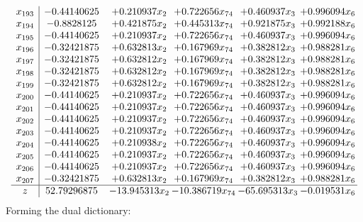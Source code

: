 \documentclass[11pt]{article}
\begin{document}
\[\begin{array}{c| c c@{\hskip 2pt} c@{\hskip 2pt} c@{\hskip 2pt} c@{\hskip 2pt} }
 x_{193}   &  -0.44140625 & + 0.210937 x_{2} & + 0.722656 x_{74} & + 0.460937 x_{3} & + 0.996094 x_{6}\\
 x_{194}   &  -0.8828125 & + 0.421875 x_{2} & + 0.445313 x_{74} & + 0.921875 x_{3} & + 0.992188 x_{6}\\
 x_{195}   &  -0.44140625 & + 0.210937 x_{2} & + 0.722656 x_{74} & + 0.460937 x_{3} & + 0.996094 x_{6}\\
 x_{196}   &  -0.32421875 & + 0.632813 x_{2} & + 0.167969 x_{74} & + 0.382812 x_{3} & + 0.988281 x_{6}\\
 x_{197}   &  -0.32421875 & + 0.632812 x_{2} & + 0.167969 x_{74} & + 0.382812 x_{3} & + 0.988281 x_{6}\\
 x_{198}   &  -0.32421875 & + 0.632812 x_{2} & + 0.167969 x_{74} & + 0.382812 x_{3} & + 0.988281 x_{6}\\
 x_{199}   &  -0.32421875 & + 0.632812 x_{2} & + 0.167969 x_{74} & + 0.382812 x_{3} & + 0.988281 x_{6}\\
 x_{200}   &  -0.44140625 & + 0.210937 x_{2} & + 0.722656 x_{74} & + 0.460937 x_{3} & + 0.996094 x_{6}\\
 x_{201}   &  -0.44140625 & + 0.210937 x_{2} & + 0.722656 x_{74} & + 0.460937 x_{3} & + 0.996094 x_{6}\\
 x_{202}   &  -0.44140625 & + 0.210937 x_{2} & + 0.722656 x_{74} & + 0.460937 x_{3} & + 0.996094 x_{6}\\
 x_{203}   &  -0.44140625 & + 0.210937 x_{2} & + 0.722656 x_{74} & + 0.460937 x_{3} & + 0.996094 x_{6}\\
 x_{204}   &  -0.44140625 & + 0.210938 x_{2} & + 0.722656 x_{74} & + 0.460937 x_{3} & + 0.996094 x_{6}\\
 x_{205}   &  -0.44140625 & + 0.210937 x_{2} & + 0.722656 x_{74} & + 0.460937 x_{3} & + 0.996094 x_{6}\\
 x_{206}   &  -0.44140625 & + 0.210937 x_{2} & + 0.722656 x_{74} & + 0.460937 x_{3} & + 0.996094 x_{6}\\
 x_{207}   &  -0.32421875 & + 0.632813 x_{2} & + 0.167969 x_{74} & + 0.382812 x_{3} & + 0.988281 x_{6}\\
\hline
z    &  52.79296875 & -13.945313 x_{2} & -10.386719 x_{74} & -65.695313 x_{3} & -0.019531 x_{6}\\
\end{array}\]
Forming the dual dictionary:
\end{document}

